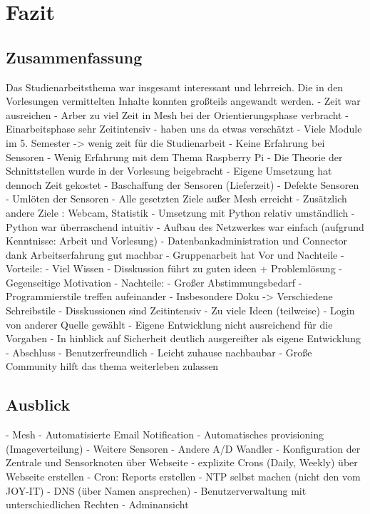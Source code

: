 \chapter{Fazit}
%
\section{Zusammenfassung}
	Das Studienarbeitsthema war insgesamt interessant und lehrreich. Die in den Vorlesungen vermittelten Inhalte konnten großteils angewandt werden.
	- Zeit war ausreichen
		- Arber zu viel Zeit in Mesh bei der Orientierungsphase verbracht
	- Einarbeitsphase sehr Zeitintensiv
		- haben uns da etwas verschätzt
		- Viele Module im 5. Semester -> wenig zeit für die Studienarbeit
		- Keine Erfahrung bei Sensoren
		- Wenig Erfahrung mit dem Thema Raspberry Pi
	- Die Theorie der Schnittstellen wurde in der Vorlesung beigebracht
		- Eigene Umsetzung hat dennoch Zeit gekostet
	- Baschaffung der Sensoren (Lieferzeit)
	- Defekte Sensoren 
		- Umlöten der Sensoren
	- Alle gesetzten Ziele außer Mesh erreicht
		- Zusätzlich andere Ziele : Webcam, Statistik
	- Umsetzung mit Python relativ umständlich
		- Python war überraschend intuitiv
	- Aufbau des Netzwerkes war einfach (aufgrund Kenntnisse: Arbeit und Vorlesung)
	- Datenbankadministration und Connector dank Arbeitserfahrung gut machbar
	- Gruppenarbeit hat Vor und Nachteile
		- Vorteile:
			- Viel Wissen
			- Disskussion führt zu guten ideen + Problemlösung
			- Gegenseitige Motivation
		- Nachteile:
			- Großer Abstimmungsbedarf
				- Programmierstile treffen aufeinander
				- Insbesondere Doku -> Verschiedene Schreibstile
			- Disskussionen sind Zeitintensiv
				- Zu viele Ideen (teilweise)
	- Login von anderer Quelle gewählt
		- Eigene Entwicklung nicht ausreichend für die Vorgaben
		- In hinblick auf Sicherheit deutlich ausgereifter als eigene Entwicklung
	- Abschluss
		- Benutzerfreundlich
		- Leicht zuhause nachbaubar
		- Große Community hilft das thema weiterleben zulassen
\section{Ausblick}
	- Mesh
	- Automatisierte Email Notification
	- Automatisches provisioning (Imageverteilung)
	- Weitere Sensoren
		- Andere A/D Wandler
	- Konfiguration der Zentrale und Sensorknoten über Webseite
		- explizite Crons (Daily, Weekly) über Webseite erstellen
			- Cron: Reports erstellen
	- NTP selbst machen (nicht den vom JOY-IT)
	- DNS (über Namen ansprechen)
	- Benutzerverwaltung mit unterschiedlichen Rechten
		- Adminansicht